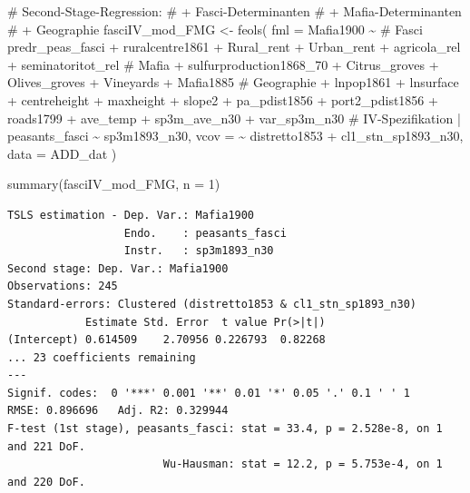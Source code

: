 \documentclass[
  a4paper,
  DIV=11,
  oneside]{scrreprt}
\newenvironment{Shaded}{\begin{snugshade}}{\end{snugshade}}
\newcommand{\AttributeTok}[1]{\textcolor[rgb]{0.40,0.45,0.13}{#1}}
\newcommand{\CommentTok}[1]{\textcolor[rgb]{0.37,0.37,0.37}{#1}}
\newcommand{\DecValTok}[1]{\textcolor[rgb]{0.68,0.00,0.00}{#1}}
\newcommand{\FunctionTok}[1]{\textcolor[rgb]{0.28,0.35,0.67}{#1}}
\newcommand{\NormalTok}[1]{\textcolor[rgb]{0.00,0.23,0.31}{#1}}
\newcommand{\OtherTok}[1]{\textcolor[rgb]{0.00,0.23,0.31}{#1}}
\newcommand{\SpecialCharTok}[1]{\textcolor[rgb]{0.37,0.37,0.37}{#1}}
\begin{document}
\begin{Shaded}
\begin{Highlighting}[]
\CommentTok{\# Second{-}Stage{-}Regression:}
\CommentTok{\# + Fasci{-}Determinanten}
\CommentTok{\# + Mafia{-}Determinanten}
\CommentTok{\# + Geographie}
\NormalTok{fasciIV\_mod\_FMG }\OtherTok{\textless{}{-}} \FunctionTok{feols}\NormalTok{(}
  \AttributeTok{fml =}\NormalTok{ Mafia1900 }\SpecialCharTok{\textasciitilde{}} 
    \CommentTok{\# Fasci}
\NormalTok{    predr\_peas\_fasci}
  \SpecialCharTok{+}\NormalTok{ ruralcentre1861}
  \SpecialCharTok{+}\NormalTok{ Rural\_rent}
  \SpecialCharTok{+}\NormalTok{ Urban\_rent}
  \SpecialCharTok{+}\NormalTok{ agricola\_rel}
  \SpecialCharTok{+}\NormalTok{ seminatoritot\_rel}
    \CommentTok{\# Mafia}
  \SpecialCharTok{+}\NormalTok{ sulfurproduction1868\_70}
  \SpecialCharTok{+}\NormalTok{ Citrus\_groves}
  \SpecialCharTok{+}\NormalTok{ Olives\_groves}
  \SpecialCharTok{+}\NormalTok{ Vineyards}
  \SpecialCharTok{+}\NormalTok{ Mafia1885}
    \CommentTok{\# Geographie}
  \SpecialCharTok{+}\NormalTok{ lnpop1861}
  \SpecialCharTok{+}\NormalTok{ lnsurface}
  \SpecialCharTok{+}\NormalTok{ centreheight}
  \SpecialCharTok{+}\NormalTok{ maxheight}
  \SpecialCharTok{+}\NormalTok{ slope2}
  \SpecialCharTok{+}\NormalTok{ pa\_pdist1856}
  \SpecialCharTok{+}\NormalTok{ port2\_pdist1856}
  \SpecialCharTok{+}\NormalTok{ roads1799}
  \SpecialCharTok{+}\NormalTok{ ave\_temp}
  \SpecialCharTok{+}\NormalTok{ sp3m\_ave\_n30}
  \SpecialCharTok{+}\NormalTok{ var\_sp3m\_n30}
   \CommentTok{\# IV{-}Spezifikation}
  \SpecialCharTok{|}\NormalTok{ peasants\_fasci }\SpecialCharTok{\textasciitilde{}}\NormalTok{ sp3m1893\_n30,}
  \AttributeTok{vcov =} \SpecialCharTok{\textasciitilde{}}\NormalTok{ distretto1853 }\SpecialCharTok{+}\NormalTok{ cl1\_stn\_sp1893\_n30,}
  \AttributeTok{data =}\NormalTok{ ADD\_dat}
\NormalTok{) }

\FunctionTok{summary}\NormalTok{(fasciIV\_mod\_FMG, }\AttributeTok{n =} \DecValTok{1}\NormalTok{)}
\end{Highlighting}
\end{Shaded}

\begin{verbatim}
TSLS estimation - Dep. Var.: Mafia1900
                  Endo.    : peasants_fasci
                  Instr.   : sp3m1893_n30
Second stage: Dep. Var.: Mafia1900
Observations: 245
Standard-errors: Clustered (distretto1853 & cl1_stn_sp1893_n30) 
            Estimate Std. Error  t value Pr(>|t|) 
(Intercept) 0.614509    2.70956 0.226793  0.82268 
... 23 coefficients remaining
---
Signif. codes:  0 '***' 0.001 '**' 0.01 '*' 0.05 '.' 0.1 ' ' 1
RMSE: 0.896696   Adj. R2: 0.329944
F-test (1st stage), peasants_fasci: stat = 33.4, p = 2.528e-8, on 1 and 221 DoF.
                        Wu-Hausman: stat = 12.2, p = 5.753e-4, on 1 and 220 DoF.
\end{verbatim}
\end{document}
